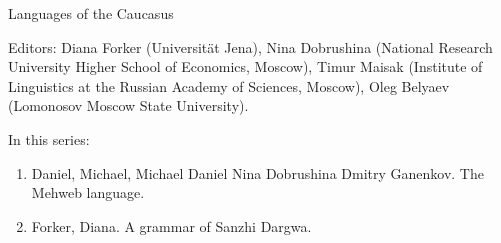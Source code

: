 {\large Languages of the Caucasus}

\bigskip
 
Editors:        
Diana Forker (Universität Jena),
Nina Dobrushina (National Research University Higher School of Economics, Moscow),
Timur Maisak (Institute of Linguistics at the Russian Academy of Sciences, Moscow),
Oleg Belyaev (Lomonosov Moscow State University).


\bigskip

In this series:

\begin{enumerate}
\item Daniel, Michael, Michael Daniel   Nina Dobrushina   Dmitry Ganenkov. The Mehweb language.
\item Forker, Diana. A grammar of Sanzhi Dargwa.
\end{enumerate}


\vfill

